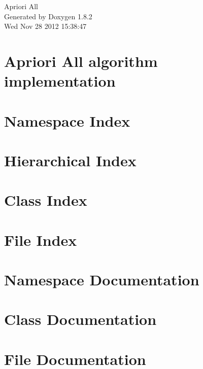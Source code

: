 \documentclass{book}
\begin{document}
\hypersetup{pageanchor=false,citecolor=blue}
\begin{titlepage}
\vspace*{7cm}
\begin{center}
{\Large Apriori All }\\
\vspace*{1cm}
{\large Generated by Doxygen 1.8.2}\\
\vspace*{0.5cm}
{\small Wed Nov 28 2012 15:38:47}\\
\end{center}
\end{titlepage}
\clearemptydoublepage
{}
\tableofcontents
\clearemptydoublepage
{}
\hypersetup{pageanchor=true,citecolor=blue}
\chapter{Apriori All algorithm implementation}
\label{index}\hypertarget{index}{}
\chapter{Namespace Index}

\chapter{Hierarchical Index}

\chapter{Class Index}

\chapter{File Index}

\chapter{Namespace Documentation}

\chapter{Class Documentation}








\chapter{File Documentation}










\printindex
\end{document}
